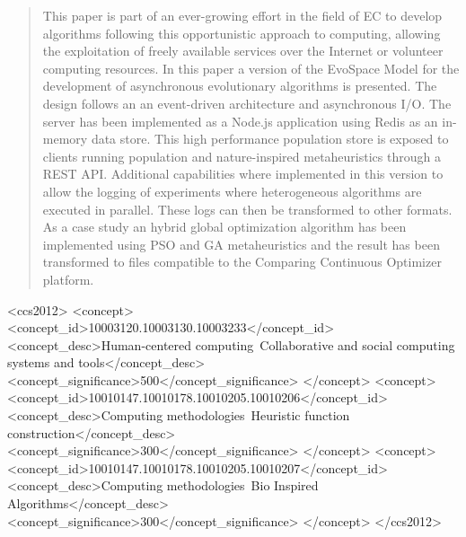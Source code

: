 \documentclass[sigconf]{acmart}
\begin{document}
\begin{abstract}




This paper is part of an ever-growing effort in the field of EC to develop algorithms
following this opportunistic approach to computing, allowing the exploitation
of freely available services over the Internet or volunteer computing resources.
In this paper a version of the EvoSpace Model for the development of asynchronous
evolutionary algorithms is presented. The design follows an an event-driven 
architecture and asynchronous I/O. The server has been implemented as a Node.js
application using Redis as an in-memory data store. This high performance population
store is exposed to clients running population and nature-inspired metaheuristics
through a REST API. Additional capabilities where implemented in this version to
allow the logging of experiments where heterogeneous algorithms are executed in parallel.
These logs can then be transformed to other formats. As a case study
an hybrid global optimization algorithm has been implemented using PSO and GA
metaheuristics and the result has been transformed to files compatible to the
Comparing Continuous Optimizer platform. 









\end{abstract}

%
%
\begin{CCSXML}
<ccs2012>
<concept>
<concept_id>10003120.10003130.10003233</concept_id>
<concept_desc>Human-centered computing~Collaborative and social computing systems and tools</concept_desc>
<concept_significance>500</concept_significance>
</concept>
<concept>
<concept_id>10010147.10010178.10010205.10010206</concept_id>
<concept_desc>Computing methodologies~Heuristic function construction</concept_desc>
<concept_significance>300</concept_significance>
</concept>
<concept>
<concept_id>10010147.10010178.10010205.10010207</concept_id>
<concept_desc>Computing methodologies~Bio Inspired Algorithms</concept_desc>
<concept_significance>300</concept_significance>
</concept>
</ccs2012>
\end{CCSXML}
\end{document}
